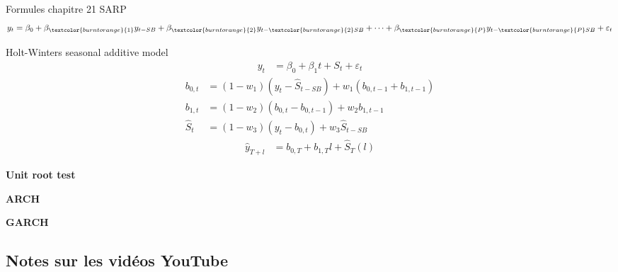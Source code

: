 \documentclass[12pt, titlepage, french]{report}
\begin{document}
\begin{FORMULA_SUMM}{Formules chapitre 21}
SAR\textcolor{burntorange}{P}
\begin{align*}
	y_{t}
	&=	\beta_{0} + \beta_{\textcolor{burntorange}{1}}y_{t - SB} + \beta_{\textcolor{burntorange}{2}} y_{t - \textcolor{burntorange}{2}SB} + \dots + \beta_{\textcolor{burntorange}{P}} y_{t - \textcolor{burntorange}{P} SB} + \varepsilon_{t}	\\
\end{align*}

Holt-Winters seasonal additive model
\begin{align*}
	y_{t} 
	&= 	\beta_{0} + \beta_{1}t + S_{t} + \varepsilon_{t}
\end{align*}
\begin{align*}
	b_{0, t}	
	&=	(1 - w_{1}) (y_{t} - \hat{S}_{t - SB}) + w_{1} (b_{0, t - 1} +  b_{1, t - 1})	\\
	b_{1, t}	
	&=	(1 - w_{2}) (b_{0, t} - b_{0, t - 1}) + w_{2} b_{1, t - 1}	\\
	\hat{S}_{t}	
	&=	(1 - w_{3}) (y_{t} - b_{0, t}) + w_{3} \hat{S}_{t - SB}	
\end{align*}
\begin{align*}
	\hat{y}_{T + l}
	&=	b_{0, T} + b_{1, T} l + \hat{S}_{T}(l)
\end{align*}

\textbf{Unit root test}

\textbf{ARCH}

\textbf{GARCH}
\end{FORMULA_SUMM}


\subsection{Notes sur les vidéos YouTube}
\end{document}
